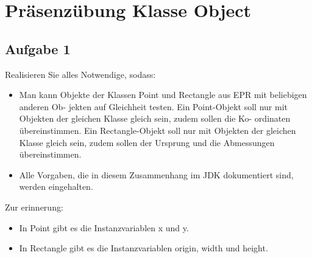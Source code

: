 \chapter{Präsenzübung Klasse Object}

\section{Aufgabe 1}
Realisieren Sie alles Notwendige, sodass:

\begin{itemize}
    \item Man kann Objekte der Klassen Point und Rectangle aus EPR mit beliebigen anderen Ob-
jekten auf Gleichheit testen.
Ein Point-Objekt soll nur mit Objekten der gleichen Klasse gleich sein, zudem sollen die Ko-
ordinaten übereinstimmen.
Ein Rectangle-Objekt soll nur mit Objekten der gleichen Klasse gleich sein, zudem sollen der
Ursprung und die Abmessungen übereinstimmen.
\item Alle Vorgaben, die in diesem Zusammenhang im JDK dokumentiert sind, werden eingehalten.
\end{itemize}

Zur erinnerung:
\begin{itemize}
    \item In Point gibt es die Instanzvariablen x und y.
    \item In Rectangle gibt es die Instanzvariablen origin, width und height.
\end{itemize}